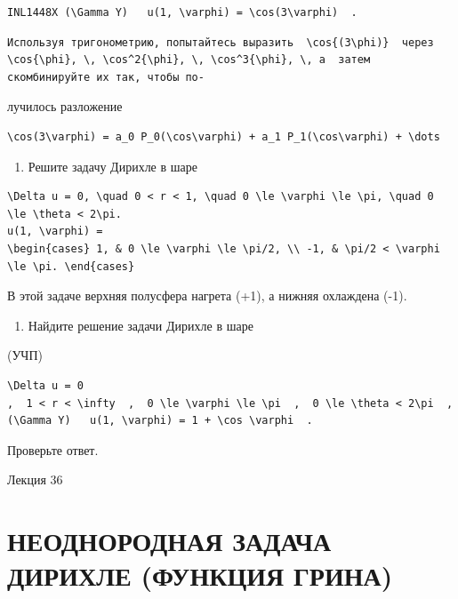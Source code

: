 \documentclass[
  ukrainian,
]{article}
\providecommand{\tightlist}{%
  \setlength{\itemsep}{0pt}\setlength{\parskip}{0pt}}
\begin{document}
\begin{verbatim}
INL1448X (\Gamma Y)   u(1, \varphi) = \cos(3\varphi)  .
\end{verbatim}

\begin{verbatim}
Используя тригонометрию, попытайтесь выразить  \cos{(3\phi)}  через  \cos{\phi}, \, \cos^2{\phi}, \, \cos^3{\phi}, \, a  затем скомбинируйте их так, чтобы по-
\end{verbatim}

лучилось разложение

\begin{verbatim}
\cos(3\varphi) = a_0 P_0(\cos\varphi) + a_1 P_1(\cos\varphi) + \dots
\end{verbatim}

\begin{enumerate}
\def\labelenumi{\arabic{enumi}.}
\setcounter{enumi}{4}
\tightlist
\item
  Решите задачу Дирихле в шаре
\end{enumerate}

\begin{verbatim}
\Delta u = 0, \quad 0 < r < 1, \quad 0 \le \varphi \le \pi, \quad 0 \le \theta < 2\pi.
u(1, \varphi) =
\begin{cases} 1, & 0 \le \varphi \le \pi/2, \\ -1, & \pi/2 < \varphi \le \pi. \end{cases}
\end{verbatim}

В этой задаче верхняя полусфера нагрета (+1), а нижняя охлаждена (-1).

\begin{enumerate}
\def\labelenumi{\arabic{enumi}.}
\setcounter{enumi}{5}
\tightlist
\item
  Найдите решение задачи Дирихле в шаре
\end{enumerate}

(УЧП)

\begin{verbatim}
\Delta u = 0
,  1 < r < \infty  ,  0 \le \varphi \le \pi  ,  0 \le \theta < 2\pi  ,  (\Gamma Y)   u(1, \varphi) = 1 + \cos \varphi  .
\end{verbatim}

Проверьте ответ.

Лекция 36

\section{НЕОДНОРОДНАЯ ЗАДАЧА ДИРИХЛЕ (ФУНКЦИЯ
ГРИНА)}\label{ux43dux435ux43eux434ux43dux43eux440ux43eux434ux43dux430ux44f-ux437ux430ux434ux430ux447ux430-ux434ux438ux440ux438ux445ux43bux435-ux444ux443ux43dux43aux446ux438ux44f-ux433ux440ux438ux43dux430}
\end{document}
